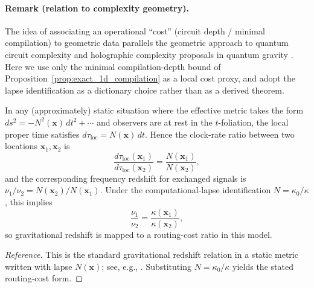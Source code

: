 \paragraph{Remark (relation to complexity geometry).}
The idea of associating an operational ``cost'' (circuit depth / minimal compilation) to geometric data parallels the geometric approach to quantum circuit complexity \cite{Nielsen2006GeometricCircuit} and holographic complexity proposals in quantum gravity \cite{BrownRobertsSusskindSwingleZhao2016}. Here we use only the minimal compilation-depth bound of Proposition~\ref{prop:exact_1d_compilation} as a local cost proxy, and adopt the lapse identification as a dictionary choice rather than as a derived theorem.
\begin{proposition}
\label{prop:redshift_from_kappa}
In any (approximately) static situation where the effective metric takes the form $ds^2=-N^2(\mathbf{x})\,dt^2+\cdots$ and observers are at rest in the $t$-foliation, the local proper time satisfies $d\tau_{\mathrm{loc}}=N(\mathbf{x})\,dt$. Hence the clock-rate ratio between two locations $\mathbf{x}_1,\mathbf{x}_2$ is
\begin{equation}
    \frac{d\tau_{\mathrm{loc}}(\mathbf{x}_1)}{d\tau_{\mathrm{loc}}(\mathbf{x}_2)}=\frac{N(\mathbf{x}_1)}{N(\mathbf{x}_2)},
\end{equation}
and the corresponding frequency redshift for exchanged signals is $\nu_1/\nu_2=N(\mathbf{x}_2)/N(\mathbf{x}_1)$. Under the computational-lapse identification $N=\kappa_0/\kappa$, this implies
\begin{equation}
    \frac{\nu_1}{\nu_2}=\frac{\kappa(\mathbf{x}_1)}{\kappa(\mathbf{x}_2)},
\end{equation}
so gravitational redshift is mapped to a routing-cost ratio in this model.
\end{proposition}
\begin{proof}[Reference]
This is the standard gravitational redshift relation in a static metric written with lapse $N(\mathbf{x})$; see, e.g., \cite{Carroll2004}. Substituting $N=\kappa_0/\kappa$ yields the stated routing-cost form.
\end{proof}

